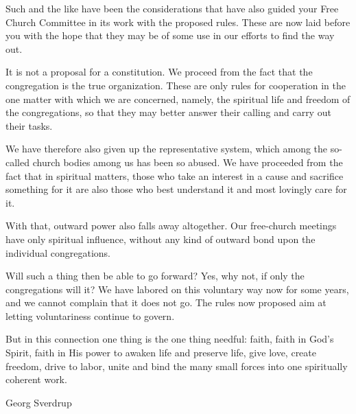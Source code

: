Such and the like have been the considerations that have also guided your Free Church Committee in its work with the proposed rules. These are now laid before you with the hope that they may be of some use in our efforts to find the way out.

It is not a proposal for a constitution. We proceed from the fact that the congregation is the true organization. These are only rules for cooperation in the one matter with which we are concerned, namely, the spiritual life and freedom of the congregations, so that they may better answer their calling and carry out their tasks.

We have therefore also given up the representative system, which among the so-called church bodies among us has been so abused. We have proceeded from the fact that in spiritual matters, those who take an interest in a cause and sacrifice something for it are also those who best understand it and most lovingly care for it.

With that, outward power also falls away altogether. Our free-church meetings have only spiritual influence, without any kind of outward bond upon the individual congregations.

Will such a thing then be able to go forward? Yes, why not, if only the congregations will it? We have labored on this voluntary way now for some years, and we cannot complain that it does not go. The rules now proposed aim at letting voluntariness continue to govern.

But in this connection one thing is the one thing needful: faith, faith in God’s Spirit, faith in His power to awaken life and preserve life, give love, create freedom, drive to labor, unite and bind the many small forces into one spiritually coherent work.

Georg Sverdrup